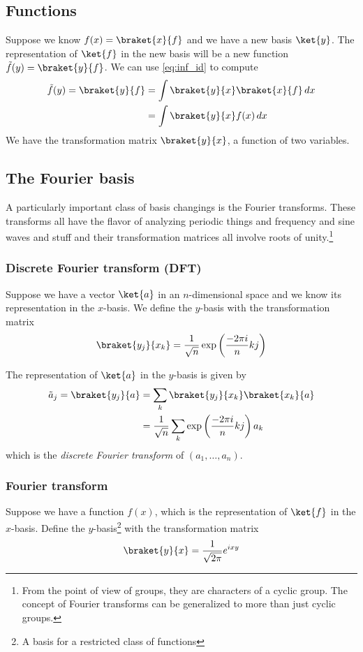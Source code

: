 \documentclass[12pt, oneside, letterpaper, fleqn]{article}
\begin{document}
\subsection{Functions}
Suppose we know $f(x) = \braket{x}{f}$ and we have a new basis
$\ket{y}$. The representation of $\ket{f}$ in the new basis will be a
new function $\tilde{f}(y) = \braket{y}{f}$. We can use
\eqref{eq:inf_id} to compute
\begin{align}
\tilde{f}(y) = \braket{y}{f} &= \int
\braket{y}{x}\braket{x}{f}\,dx\nonumber\\
&= \int \braket{y}{x} f(x)\,dx
\end{align}
We have the transformation matrix $\braket{y}{x}$, a function of two
variables.

\subsection{The Fourier basis}
A particularly important class of basis changings is the Fourier
transforms. These transforms all have the flavor of analyzing periodic
things and frequency and sine waves and stuff and their transformation
matrices all involve roots of unity.\footnote{From the point of view of
groups, they are characters of a cyclic group. The concept of Fourier
transforms can be generalized to more than just cyclic groups.}

\subsubsection{Discrete Fourier transform (DFT)}
Suppose we have a vector $\ket{a}$ in an $n$-dimensional space and we
know its representation in the $x$-basis. We define the $y$-basis with
the transformation matrix
\begin{align}
\braket{y_j}{x_k} = \frac{1}{\sqrt{n}}\exp\left(\frac{-2\pi i}{n}
kj\right)
\end{align}

The representation of $\ket{a}$ in the $y$-basis is given by
\begin{align}
\tilde{a}_j = \braket{y_j}{a} &= \sum_k
\braket{y_j}{x_k}\braket{x_k}{a}\nonumber\\
&= \frac{1}{\sqrt{n}} \sum_k \exp\left(\frac{-2\pi i}{n} kj\right) a_k
\end{align}
which is the \emph{discrete Fourier transform} of $(a_1,\dotsc,
a_n)$.

\subsubsection{Fourier transform}
Suppose we have a function $f(x)$, which is the representation of
$\ket{f}$ in the $x$-basis. Define the $y$-basis\footnote{A basis for a
restricted class of functions} with the transformation matrix
\begin{align}
\braket{y}{x} = \frac{1}{\sqrt{2\pi}} e^{ixy}
\end{align}
\end{document}
